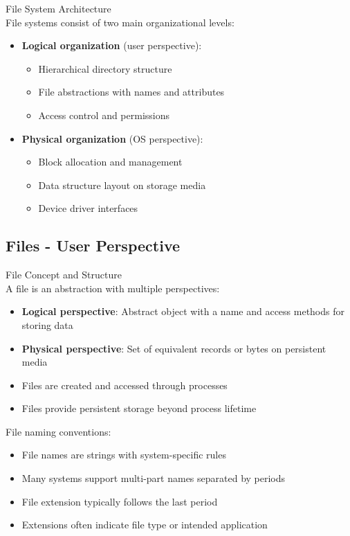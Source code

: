 \begin{minipage}{0.45\linewidth}
\begin{definition}{File System Architecture}\\
    File systems consist of two main organizational levels:
    \begin{itemize}
        \item \textbf{Logical organization} (user perspective):
            \begin{itemize}
                \item Hierarchical directory structure
                \item File abstractions with names and attributes
                \item Access control and permissions
            \end{itemize}
        \item \textbf{Physical organization} (OS perspective):
            \begin{itemize}
                \item Block allocation and management
                \item Data structure layout on storage media
                \item Device driver interfaces
            \end{itemize}
    \end{itemize}
\end{definition}
\end{minipage}

\subsection{Files - User Perspective}



\begin{concept}{File Concept and Structure}\\
    A file is an abstraction with multiple perspectives:
    \begin{itemize}
        \item \textbf{Logical perspective}: Abstract object with a name and access methods for storing data
        \item \textbf{Physical perspective}: Set of equivalent records or bytes on persistent media
        \item Files are created and accessed through processes
        \item Files provide persistent storage beyond process lifetime
    \end{itemize}
    
    File naming conventions:
    \begin{itemize}
        \item File names are strings with system-specific rules
        \item Many systems support multi-part names separated by periods
        \item File extension typically follows the last period
        \item Extensions often indicate file type or intended application
    \end{itemize}
\end{concept}

